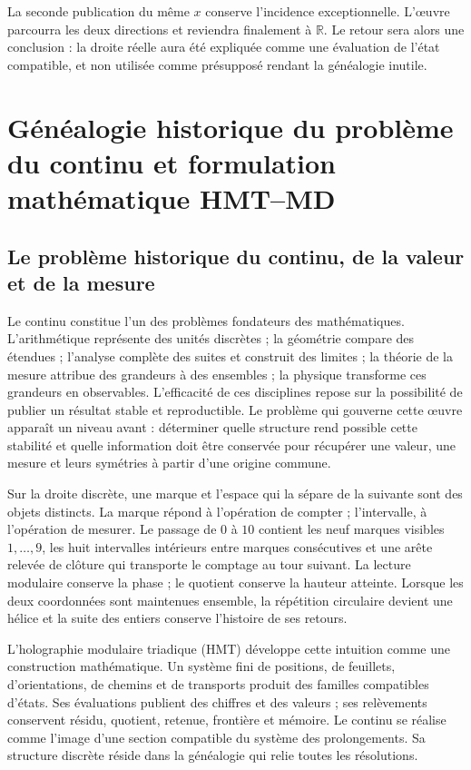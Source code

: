 La seconde publication du même \(x\) conserve l'incidence exceptionnelle.
L'œuvre parcourra les deux directions et reviendra finalement à
\(\mathbb R\). Le retour sera alors une conclusion : la droite réelle aura
été expliquée comme une évaluation de l'état compatible, et non utilisée
comme présupposé rendant la généalogie inutile.


\section{Généalogie historique du problème du continu et formulation mathématique HMT–MD}

\subsection*{Le problème historique du continu, de la valeur et de la mesure}

Le continu constitue l'un des problèmes fondateurs des
mathématiques. L'arithmétique représente des unités discrètes ; la géométrie
compare des étendues ; l'analyse complète des suites et construit des limites ; la
théorie de la mesure attribue des grandeurs à des ensembles ; la physique transforme ces
grandeurs en observables. L'efficacité de ces disciplines repose sur la
possibilité de publier un résultat stable et reproductible. Le problème qui
gouverne cette œuvre apparaît un niveau avant : déterminer quelle structure rend
possible cette stabilité et quelle information doit être conservée pour récupérer une
valeur, une mesure et leurs symétries à partir d'une origine commune.

Sur la droite discrète, une marque et l'espace qui la sépare de la suivante sont des
objets distincts. La marque répond à l'opération de compter ; l'intervalle,
à l'opération de mesurer. Le passage de \(0\) à \(10\) contient les neuf marques
visibles \(1,\ldots,9\), les huit intervalles intérieurs entre marques
consécutives et une arête relevée de clôture qui transporte le comptage au
tour suivant. La lecture modulaire conserve la phase ; le quotient conserve
la hauteur atteinte. Lorsque les deux coordonnées sont maintenues ensemble, la
répétition circulaire devient une hélice et la suite des entiers
conserve l'histoire de ses retours.

L'holographie modulaire triadique (HMT) développe cette intuition comme une
construction mathématique. Un système fini de positions, de feuillets,
d'orientations, de chemins et de transports produit des familles compatibles d'états.
Ses évaluations publient des chiffres et des valeurs ; ses relèvements conservent
résidu, quotient, retenue, frontière et mémoire. Le continu se réalise comme
l'image d'une section compatible du système des prolongements. Sa
structure discrète réside dans la généalogie qui relie toutes les
résolutions.


